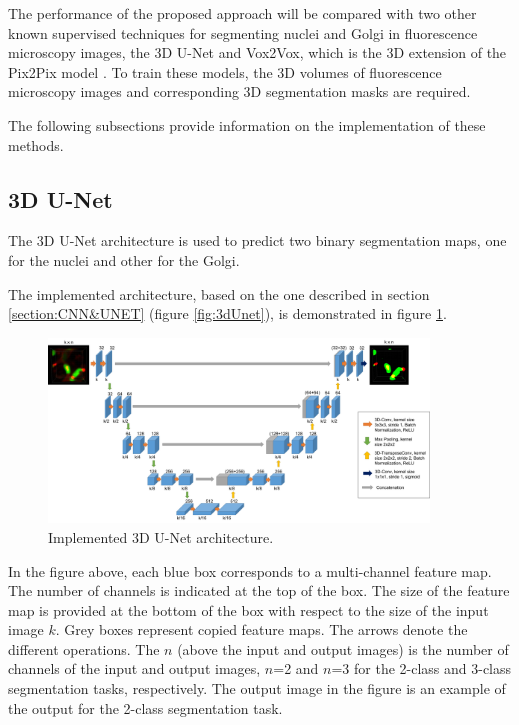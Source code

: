 The performance of the proposed approach will be compared with two other known supervised techniques for segmenting nuclei and Golgi in fluorescence microscopy images, the 3D U-Net \cite{Unet:3D} and Vox2Vox, which is the 3D extension of the Pix2Pix model \cite{isola2018imagetoimage}. To train these models, the 3D volumes of fluorescence microscopy images and corresponding 3D segmentation masks are required.

The following subsections provide information on the implementation of these methods.

\subsection{3D U-Net}

The 3D U-Net architecture is used to predict two binary segmentation maps, one for the nuclei and other for the Golgi.

The implemented architecture, based on the one described in section \ref{section:CNN&UNET} (figure \ref{fig:3dUnet}), is demonstrated in figure \ref{fig:y-unet-3d}.

\begin{figure}[!htb]
  \centering
  \includegraphics[width=0.90\textwidth]{Images/Picture1.jpg}
  \caption{Implemented 3D U-Net architecture.}
  \label{fig:y-unet-3d}
\end{figure}

In the figure above, each blue box corresponds to a multi-channel feature map. The number of channels is indicated at the top of the box. The size of the feature map is provided at the bottom of the box with respect to the size of the input image $k$. Grey boxes represent copied feature maps. The arrows denote the different operations. The $n$ (above the input and output images) is the number of channels of the input and output images, $n$=2 and $n$=3 for the 2-class and 3-class segmentation tasks, respectively. The output image in the figure is an example of the output for the 2-class segmentation task.

